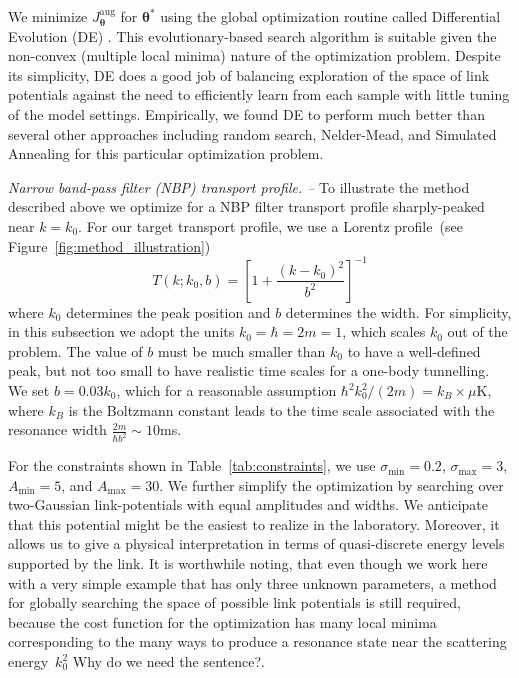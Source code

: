 \documentclass[twocolumn,amsmath,amssymb,showpacs,prl,superscriptaddress,aps]{revtex4-1}
\begin{document}
We minimize $J_{\bm{\theta}}^{\mathrm{aug}}$ for $\bm{\theta}^*$ using the global optimization routine called Differential Evolution (DE) \cite{storn1997differential}. This evolutionary-based search algorithm is suitable given the non-convex (multiple local minima) nature of the optimization problem. Despite its simplicity, DE does a good job of balancing exploration of the space of link potentials against the need to efficiently learn from each sample with little tuning of the model settings. Empirically, we found DE to perform much better than several other approaches including random search, Nelder-Mead, and Simulated Annealing for this particular optimization problem.



{\it Narrow band-pass filter (NBP) transport profile. --}
To illustrate the method described above we optimize for a NBP filter transport profile sharply-peaked near $k=k_0$. 
{\color{blue} For our target transport profile, we use a Lorentz profile~(see Figure~\ref{fig:method_illustration})
\begin{equation}\label{eq:Ttarget}
  T(k; k_0,b) = \left[1 + \frac{(k-k_0)^2}{b^2}\right]^{-1}
\end{equation}
where $k_0$ determines the peak position and $b$ determines the width. 
For simplicity, in this subsection we adopt the units $k_0=\hbar=2m=1$, which scales $k_0$
out of the problem. The value of $b$ must be much smaller than $k_0$ 
to have a well-defined peak, but not too small to have realistic time scales
for a one-body tunnelling. We set $b=0.03 k_0$, which for a reasonable assumption 
$\hbar^2k_0^2/(2m)=k_B\times \mu$K, where $k_B$ is the Boltzmann constant leads to 
the time scale associated with the resonance width $\frac{2m}{\hbar b^2}\sim 10$ms.}



 For the constraints shown in Table~\ref{tab:constraints}, we use $\sigma_{\mathrm{min}}=0.2$, $\sigma_{\mathrm{max}}=3$, $A_{\mathrm{min}}=5$, and $A_{\mathrm{max}}=30$. We further simplify the optimization by searching over two-Gaussian link-potentials with equal amplitudes and widths. We anticipate that this potential might be the easiest to realize in the laboratory. Moreover, it allows us to give a physical interpretation in terms of quasi-discrete energy levels supported by the link.  It is worthwhile noting, that even though we work here with a very simple example that has only three unknown parameters, a method for globally searching the space of possible link potentials is still required, because the cost function for the optimization has many local minima corresponding to the many ways to produce a resonance state near the scattering energy~$k_0^2$ {\color{red} Why do we need the sentence?}. 
\end{document}

